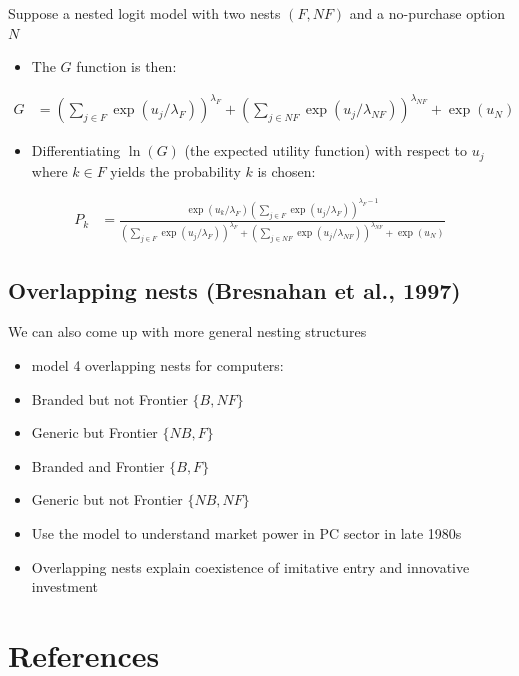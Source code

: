\documentclass[11pt]{article}
\begin{document}
Suppose a nested logit model with two nests \((F,NF)\) and a no-purchase option \(N\)

\begin{itemize}
\item The \(G\) function is then:
\end{itemize}
\begin{align*}
G&=\left(\sum_{j\in F}\exp(u_j/\lambda_F)\right)^{\lambda_F}+\left(\sum_{j\in NF}\exp(u_j/\lambda_{NF})\right)^{\lambda_{NF}}+\exp(u_N)
\end{align*}

\begin{itemize}
\item Differentiating \(\ln(G)\) (the expected utility function) with respect to \(u_j\) where \(k\in F\) yields the probability \(k\) is chosen:
\end{itemize}

\begin{align*}
P_k&=\frac{\exp(u_k/\lambda_F)\left(\sum_{j\in F}\exp(u_j/\lambda_F)\right)^{\lambda_F-1}}{\left(\sum_{j\in F}\exp(u_j/\lambda_F)\right)^{\lambda_F}+\left(\sum_{j\in NF}\exp(u_j/\lambda_{NF})\right)^{\lambda_{NF}}+\exp(u_N)}
\end{align*}

\subsection{Overlapping nests (Bresnahan et al., 1997)}
\label{sec:orgb35c84f}

We can also come up with more general nesting structures

\begin{itemize}
\item \textcite{bst1997} model 4 overlapping nests for computers:

\item Branded but not Frontier \(\{B,NF\}\)
\item Generic but Frontier  \(\{NB,F\}\)
\item Branded and Frontier  \(\{B,F\}\)
\item Generic but not Frontier  \(\{NB,NF\}\)

\item Use the model to understand market power in PC sector in late 1980s

\item Overlapping nests explain coexistence of imitative entry and innovative investment
\end{itemize}


\section*{References}
\label{sec:org568be15}
\end{document}
